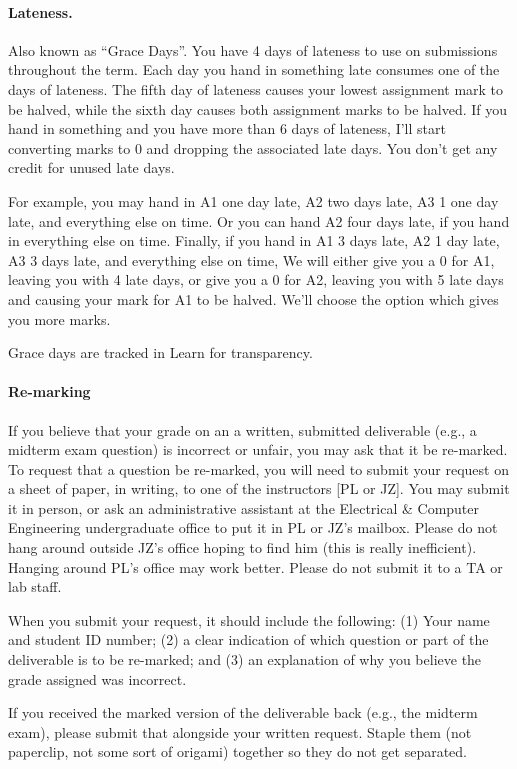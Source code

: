 \documentclass[letterpaper,10pt]{article}
\begin{document}
\paragraph{Lateness.} Also known as ``Grace Days''. You have 4 days of lateness to use on 
submissions throughout the term. Each day you hand in something late
consumes one of the days of lateness. The fifth day of lateness causes
your lowest assignment mark to be halved, while the sixth day causes
both assignment marks to be halved. If you hand in something and you
have more than 6 days of lateness, I'll start converting marks to 0
and dropping the associated late days. You don't
get any credit for unused late days.

For example, you may hand in A1 one day late, A2 two days late, A3 1
one day late, and everything else on time.  Or you can hand A2 four
days late, if you hand in everything else on time. Finally, if you
hand in A1 3 days late, A2 1 day late, A3 3 days late, and
everything else on time, We will either give you a 0 for A1, leaving you
with 4 late days, or give you a 0 for A2, leaving you with 5 late days
and causing your mark for A1 to be halved. We'll choose the option
which gives you more marks.

Grace days are tracked in Learn for transparency.

\paragraph{Re-marking}
If you believe that your grade on an a written, submitted deliverable (e.g., a midterm exam question) is incorrect or unfair, you may ask that it be re-marked. To request that a question be re-marked, you will need to submit your request on a sheet of paper, in writing, to one of the instructors [PL or JZ]. You may submit it in person, or ask an administrative assistant at the Electrical \& Computer Engineering undergraduate office to put it in PL or JZ's mailbox. Please do not hang around outside JZ's office hoping to find him (this is really inefficient). Hanging around PL's office may work better. Please do not submit it to a TA or lab staff.

When you submit your request, it should include the following: (1) Your name and student ID number; (2) a clear indication of which question or part of the deliverable is to be re-marked; and (3) an explanation of why you believe the grade assigned was incorrect.

If you received the marked version of the deliverable back (e.g., the midterm exam), please submit that alongside your written request. Staple them (not paperclip, not some sort of origami) together so they do not get separated.
\end{document}
